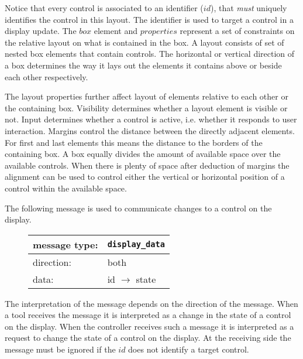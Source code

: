\documentclass{article}
\newcommand{\msg}[1]{\texttt{#1}}
\begin{document}
   \vspace{-0.4cm}
   \noindent Notice that every control is associated to an identifier ($id$),
   that \emph{must} uniquely identifies the control in this layout. The
   identifier is used to target a control in a display update.  The $box$
   element and $properties$ represent a set of constraints on the relative
   layout on what is contained in the box. A layout consists of set of nested
   box elements that contain controls.  The horizontal or vertical direction of
   a box determines the way it lays out the elements it contains above or
   beside each other respectively.

   The layout properties further affect layout of elements relative to each
   other or the containing box. Visibility determines whether a layout element
   is visible or not. Input determines whether a control is active, i.e.
   whether it responds to user interaction. Margins control the distance
   between the directly adjacent elements. For first and last elements this
   means the distance to the borders of the containing box. A box equally
   divides the amount of available space over the available controls. When
   there is plenty of space after deduction of margins the alignment can be
   used to control either the vertical or horizontal position of a control
   within the available space.

   The following message is used to communicate changes to a control on the
   display.

   \begin{figure}[H]
    \begin{center}
     \begin{tabular}{|ll|}
      \hline
       message type:   & \msg{display\_data} \\
      \hline
       direction:      & both \\
       data:           & id $\rightarrow$ state \\
      \hline
     \end{tabular}
    \end{center}
   \end{figure}
   \vspace{-0.4cm}
   \noindent The interpretation of the message depends on the direction of the
   message. When a tool receives the message it is interpreted as a change in
   the state of a control on the display. When the controller receives such a
   message it is interpreted as a request to change the state of a control on
   the display. At the receiving side the message must be ignored if the $id$
   does not identify a target control.
\end{document}
